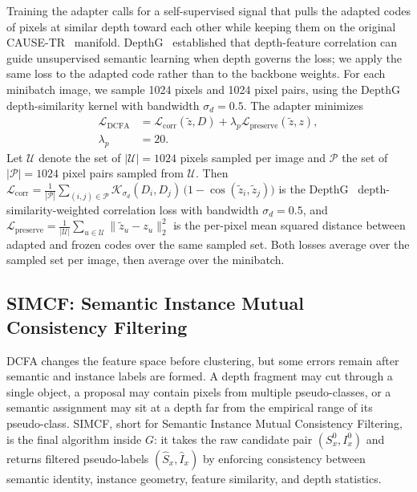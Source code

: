 \documentclass[10pt,twocolumn,letterpaper]{article}
\newcounter{algorithm}
\begin{document}
Training the adapter calls for a self-supervised signal that pulls the adapted codes of pixels at similar depth toward each other while keeping them on the original CAUSE-TR~\cite{kim2024cause} manifold. DepthG~\cite{sick2024depthg} established that depth-feature correlation can guide unsupervised semantic learning when depth governs the loss; we apply the same loss to the adapted code rather than to the backbone weights. For each minibatch image, we sample 1024 pixels and 1024 pixel pairs, using the DepthG~\cite{sick2024depthg} depth-similarity kernel with bandwidth $\sigma_d = 0.5$. The adapter minimizes
\begin{equation}
\begin{aligned}
\mathcal{L}_\text{DCFA}
&= \mathcal{L}_\text{corr}(\tilde z, D)
 + \lambda_p \mathcal{L}_\text{preserve}(\tilde z, z), \\
\lambda_p &= 20 .
\end{aligned}
\label{eq:dcfa_loss}
\end{equation}
Let $\mathcal{U}$ denote the set of $|\mathcal{U}| = 1024$ pixels sampled per image and $\mathcal{P}$ the set of $|\mathcal{P}| = 1024$ pixel pairs sampled from $\mathcal{U}$. Then $\mathcal{L}_\text{corr} = \frac{1}{|\mathcal{P}|} \sum_{(i,j) \in \mathcal{P}} \mathcal{K}_{\sigma_d}(D_i, D_j)\,\big(1 - \cos(\tilde z_i, \tilde z_j)\big)$ is the DepthG~\cite{sick2024depthg} depth-similarity-weighted correlation loss with bandwidth $\sigma_d = 0.5$, and $\mathcal{L}_\text{preserve} = \frac{1}{|\mathcal{U}|} \sum_{u \in \mathcal{U}} \|\tilde z_u - z_u\|_2^2$ is the per-pixel mean squared distance between adapted and frozen codes over the same sampled set. Both losses average over the sampled set per image, then average over the minibatch.
\subsection{SIMCF: Semantic Instance Mutual Consistency Filtering}
\label{sec:method:simcf}

DCFA changes the feature space before clustering, but some errors remain after semantic and instance labels are formed. A depth fragment may cut through a single object, a proposal may contain pixels from multiple pseudo-classes, or a semantic assignment may sit at a depth far from the empirical range of its pseudo-class. SIMCF, short for Semantic Instance Mutual Consistency Filtering, is the final algorithm inside $G$: it takes the raw candidate pair $(S_x^0, I_x^0)$ and returns filtered pseudo-labels $(\hat S_x, \hat I_x)$ by enforcing consistency between semantic identity, instance geometry, feature similarity, and depth statistics.
\end{document}
